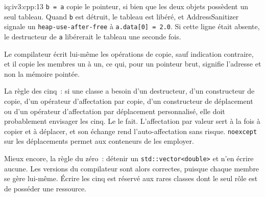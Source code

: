 \begin{solution}{iq:iv3:cpp:13}
\texttt{b = a} copie le pointeur, si bien que les deux objets possèdent un seul tableau. Quand \texttt{b} est détruit, le tableau est libéré, et AddressSanitizer signale un \texttt{heap-use-after-free} à \texttt{a.data[0] = 2.0}. Si cette ligne était absente, le destructeur de \texttt{a} libérerait le tableau une seconde fois.

Le compilateur écrit lui-même les opérations de copie, sauf indication contraire, et il copie les membres un à un, ce qui, pour un pointeur brut, signifie l'adresse et non la mémoire pointée.

La règle des cinq~: si une classe a besoin d'un destructeur, d'un constructeur de copie, d'un opérateur d'affectation par copie, d'un constructeur de déplacement ou d'un opérateur d'affectation par déplacement personnalisé, elle doit probablement envisager les cinq. Le  le fait. L'affectation par valeur sert à la fois à copier et à déplacer, et son échange rend l'auto-affectation sans risque. \texttt{noexcept} sur les déplacements permet aux conteneurs de les employer.
\label{lst:iv3:cp:bufferfive}

Mieux encore, la règle du zéro~: détenir un \texttt{std::vector<double>} et n'en écrire aucune. Les versions du compilateur sont alors correctes, puisque chaque membre se gère lui-même. Écrire les cinq est réservé aux rares classes dont le seul rôle est de posséder une ressource.

\end{solution}

